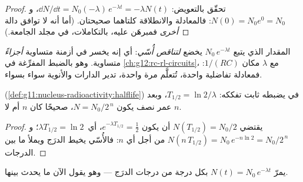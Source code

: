 \begin{proof}
تحقّق بالتعويض:
$\dd N/\dd t = N_0(-\lambda)\,e^{-\lambda t} = -\lambda N(t)$، و
$N(0) = N_0 e^0 = N_0$: فالمعادلة والانطلاقة كلتاهما صحيحتان. (أما أنه لا توافق
دالة \emph{أخرى} فمبرهَن عليه، بالتكاملات، في مجلد
الجامعة.)
\end{proof}

\begin{definition}\label{def:g12:radioactive-decay:exponential}
المقدار الذي يتبع $N_0\,e^{-\lambda t}$ يخضع \emph{لتناقص
أُسّي}: أي إنه يخسر في أزمنة متساوية \emph{أجزاءً}
متساوية. وهو بالضبط  المفرِّغة في
\cref{ch:g12:rc-rl-circuits}، مع $\lambda$ مكان $1/(RC)$: فمعادلة
تفاضلية واحدة، تُتعلَّم مرة واحدة، تدير الدارات والأنوية سواء بسواء.
\end{definition}

\begin{proposition}\label{prop:g12:radioactive-decay:halflife}
 (\cref{def:g11:nucleus-radioactivity:halflife}) في 
يضبطه ثابت تفككه: $T_{1/2} = \ln 2/\lambda$، وبعد $n$
عمر نصف يكون $N = N_0/2^{\,n}$، صحيحًا كان $n$ أم لا.
\end{proposition}

\begin{proof}
يقتضي $N(T_{1/2}) = N_0/2$ أن يكون $e^{-\lambda T_{1/2}} = \tfrac12$، أي\
$\lambda T_{1/2} = \ln 2$؛ و$N(n\,T_{1/2}) = N_0\,e^{-n\ln 2} =
N_0/2^{\,n}$ من أجل أي $n$: فالأُسّي يخيط الدرَج
ويملأ ما بين الدرجات.
\end{proof}

\begin{omfigure}

{\small يمرّ $N(t) = N_0\,e^{-\lambda t}$ بكل درجة من درجات
الدرَج --- وهو يقول الآن ما يحدث بينها.}
\end{omfigure}

